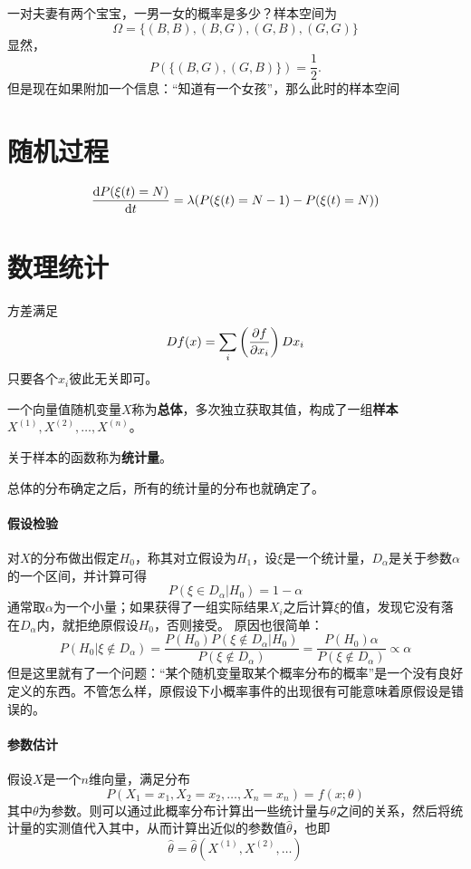 \documentclass[UTF8, a4paper]{ctexart}
\begin{document}
\newcommand*{\example}{\paragraph{例}} 一对夫妻有两个宝宝，一男一女的概率是多少？样本空间为
\[
    \Omega = \{ (B, B), (B, G), (G, B), (G, G) \}
\]
显然，
\[
    P(\{ (B, G), (G, B) \}) = \frac{1}{2}.
\]
但是现在如果附加一个信息：“知道有一个女孩”，那么此时的样本空间

\section{随机过程}

\begin{equation}
    \dv{P(\xi(t) = N)}{t} = \lambda (P(\xi(t)=N-1) - P(\xi(t) = N))
\end{equation}

\section{数理统计}

方差满足
\[
    D f(x) = \sum_i \left( \pdv{f}{x_i} \right) Dx_i
\]
只要各个$x_i$彼此无关即可。

一个向量值随机变量$X$称为\textbf{总体}，多次独立获取其值，构成了一组\textbf{样本}$X^{(1)}, X^{(2)}, \ldots, X^{(n)}$。

关于样本的函数称为\textbf{统计量}。

总体的分布确定之后，所有的统计量的分布也就确定了。

\paragraph{假设检验} 对$X$的分布做出假定$H_0$，称其对立假设为$H_1$，设$\xi$是一个统计量，$D_\alpha$是关于参数$\alpha$的一个区间，并计算可得
\[
    P(\xi \in D_\alpha | H_0 ) = 1 - \alpha
\]
通常取$\alpha$为一个小量；如果获得了一组实际结果$X_i$之后计算$\xi$的值，发现它没有落在$D_\alpha$内，就拒绝原假设$H_0$，否则接受。
原因也很简单：
\[
    P ( H_0 | \xi \notin D_\alpha ) = \frac{P(H_0) P(\xi \notin D_\alpha | H_0)}{P(\xi \notin D_\alpha)} 
    = \frac{P(H_0) \alpha}{P(\xi \notin D_\alpha)} \propto \alpha
\]
但是这里就有了一个问题：“某个随机变量取某个概率分布的概率”是一个没有良好定义的东西。不管怎么样，原假设下小概率事件的出现很有可能意味着原假设是错误的。

\paragraph{参数估计} 假设$X$是一个$n$维向量，满足分布
\[
    P(X_1 = x_1, X_2 = x_2 , \ldots, X_n = x_n) = f(x;\theta)
\]
其中$\theta$为参数。则可以通过此概率分布计算出一些统计量与$\theta$之间的关系，然后将统计量的实测值代入其中，从而计算出近似的参数值$\hat{\theta}$，也即
\[
    \hat{\theta} = \hat{\theta}(X^{(1)}, X^{(2)}, \ldots)
\]
\end{document}
